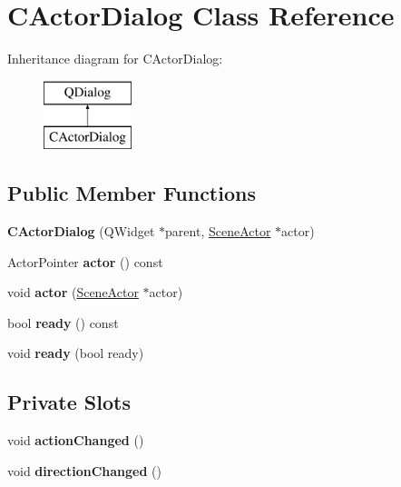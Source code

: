 \hypertarget{class_c_actor_dialog}{}\section{C\+Actor\+Dialog Class Reference}
\label{class_c_actor_dialog}
Inheritance diagram for C\+Actor\+Dialog\+:\begin{figure}[H]
\begin{center}
\leavevmode
\includegraphics[height=2.000000cm]{class_c_actor_dialog}
\end{center}
\end{figure}
\subsection*{Public Member Functions}
\begin{DoxyCompactItemize}
\item 
\mbox{\label{class_c_actor_dialog_ab5e2851d456a8f30cb92e924c4caa169}} 
{\bfseries C\+Actor\+Dialog} (Q\+Widget $\ast$parent, \hyperlink{class_actor}{Scene\+Actor} $\ast$actor)
\item 
\mbox{\label{class_c_actor_dialog_a65753212c116f5f206781087e89b3056}} 
Actor\+Pointer {\bfseries actor} () const
\item 
\mbox{\label{class_c_actor_dialog_a16f344a74f4cb18be54dcb7276b88f0a}} 
void {\bfseries actor} (\hyperlink{class_actor}{Scene\+Actor} $\ast$actor)
\item 
\mbox{\label{class_c_actor_dialog_a5ef6716e99b97c16ccd312a65664df89}} 
bool {\bfseries ready} () const
\item 
\mbox{\label{class_c_actor_dialog_ad124b2207c58cc64862a1230ec7b61a7}} 
void {\bfseries ready} (bool ready)
\end{DoxyCompactItemize}
\subsection*{Private Slots}
\begin{DoxyCompactItemize}
\item 
\mbox{\label{class_c_actor_dialog_a5689a0c318f93311a8ceae4c73edcf8f}} 
void {\bfseries action\+Changed} ()
\item 
\mbox{\label{class_c_actor_dialog_ad04e8bcbc3be25075f0e72fcc7b6a963}} 
void {\bfseries direction\+Changed} ()
\end{DoxyCompactItemize}
